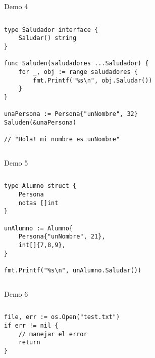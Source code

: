 \begin{frame}[fragile]{Demo 4}

{
    \renewcommand{\baselinestretch}{1} 

    \begin{columns}
        \begin{lstlisting}[title={Interfases y funciones con argumentos variantes}]
type Saludador interface {
    Saludar() string
}

func Saluden(saludadores ...Saludador) {
    for _, obj := range saludadores {
        fmt.Printf("%s\n", obj.Saludar())
    }
}

unaPersona := Persona{"unNombre", 32}
Saluden(&unaPersona)

// "Hola! mi nombre es unNombre"

        \end{lstlisting}
    \end{columns}
}

\end{frame}


\begin{frame}[fragile]{Demo 5}

{
    \renewcommand{\baselinestretch}{1} 

    \begin{columns}
        \begin{lstlisting}[title={Estructuras complejas mediante composición, no herencia}]
type Alumno struct {
    Persona
    notas []int
}

unAlumno := Alumno{
    Persona{"unNombre", 21},
    int[]{7,8,9},
}

fmt.Printf("%s\n", unAlumno.Saludar())
        \end{lstlisting}
    \end{columns}
}

\end{frame}

\begin{frame}[fragile]{Demo 6}

{
    \renewcommand{\baselinestretch}{1} 

    \begin{columns}
        \begin{lstlisting}[title={\centering Manejo de situaciones inespereadas a través de devolución de valores de error}]
file, err := os.Open("test.txt")
if err != nil {
    // manejar el error
    return
}
        \end{lstlisting}
    \end{columns}
}

\end{frame}

